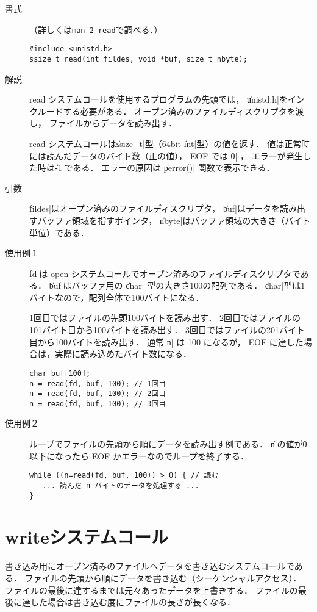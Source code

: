\begin{description}
\item[書式]（詳しくは\texttt{man 2 read}で調べる．）

\begin{lstlisting}[numbers=none]
#include <unistd.h>
ssize_t read(int fildes, void *buf, size_t nbyte);
\end{lstlisting}

\item[解説]
read システムコールを使用するプログラムの先頭では，
\|unistd.h|をインクルードする必要がある．
オープン済みのファイルディスクリプタを渡し，
ファイルからデータを読み出す．

read システムコールは\|ssize_t|型（64bit \|int|型）の値を返す．
値は正常時には読んだデータのバイト数（正の値），
EOF では \|0| ，
エラーが発生した時は\|-1|である．
エラーの原因は \|perror()| 関数で表示できる．

\item[引数]
\|fildes|はオープン済みのファイルディスクリプタ，
\|buf|はデータを読み出すバッファ領域を指すポインタ，
\|nbyte|はバッファ領域の大きさ（バイト単位）である．

\item[使用例１]
\|fd|は open システムコールでオープン済みのファイルディスクリプタである．
\|buf|はバッファ用の \|char| 型の大きさ100の配列である．
\|char|型は1バイトなので，配列全体で100バイトになる．

1回目ではファイルの先頭100バイトを読み出す．
2回目ではファイルの101バイト目から100バイトを読み出す．
3回目ではファイルの201バイト目から100バイトを読み出す．
通常 \|n| は 100 になるが，
EOF に達した場合は，実際に読み込めたバイト数になる．

\begin{lstlisting}[numbers=none]
char buf[100];
n = read(fd, buf, 100); // 1回目
n = read(fd, buf, 100); // 2回目
n = read(fd, buf, 100); // 3回目
\end{lstlisting}

\item[使用例２]
ループでファイルの先頭から順にデータを読み出す例である．
\|n|の値が\|0|以下になったら EOF かエラーなのでループを終了する．

\begin{lstlisting}[numbers=none]
while ((n=read(fd, buf, 100)) > 0) { // 読む
   ... 読んだ n バイトのデータを処理する ...
}
\end{lstlisting}
\end{description}

\section{writeシステムコール}
書き込み用にオープン済みのファイルへデータを書き込むシステムコールである．
ファイルの先頭から順にデータを書き込む（シーケンシャルアクセス）．
ファイルの最後に達するまでは元々あったデータを上書きする．
ファイルの最後に達した場合は書き込む度にファイルの長さが長くなる．


